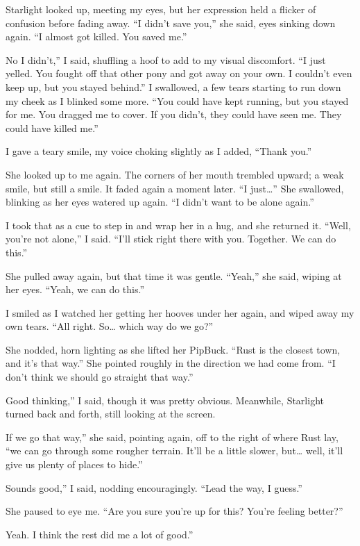 Starlight looked up, meeting my eyes, but her expression held a flicker of confusion before fading away. “I didn’t save you,” she said, eyes sinking down again. “I almost got killed. You saved me.”

\leavevmode{}No I didn’t,” I said, shuffling a hoof to add to my visual discomfort. “I just yelled. You fought off that other pony and got away on your own. I couldn’t even keep up, but you stayed behind.” I swallowed, a few tears starting to run down my cheek as I blinked some more. “You could have kept running, but you stayed for me. You dragged me to cover. If you didn’t, they could have seen me. They could have killed me.”

I gave a teary smile, my voice choking slightly as I added, “Thank you.”

She looked up to me again. The corners of her mouth trembled upward; a weak smile, but still a smile. It faded again a moment later. “I just…” She swallowed, blinking as her eyes watered up again. “I didn’t want to be alone again.”

I took that as a cue to step in and wrap her in a hug, and she returned it. “Well, you’re not alone,” I said. “I’ll stick right there with you. Together. We can do this.”

She pulled away again, but that time it was gentle. “Yeah,” she said, wiping at her eyes. “Yeah, we can do this.”

I smiled as I watched her getting her hooves under her again, and wiped away my own tears. “All right. So… which way do we go?”

She nodded, horn lighting as she lifted her PipBuck. “Rust is the closest town, and it’s that way.” She pointed roughly in the direction we had come from. “I don’t think we should go straight that way.”

\leavevmode{}Good thinking,” I said, though it was pretty obvious. Meanwhile, Starlight turned back and forth, still looking at the screen.

\leavevmode{}If we go that way,” she said, pointing again, off to the right of where Rust lay, “we can go through some rougher terrain. It’ll be a little slower, but… well, it’ll give us plenty of places to hide.”

\leavevmode{}Sounds good,” I said, nodding encouragingly. “Lead the way, I guess.”

She paused to eye me. “Are you sure you’re up for this? You’re feeling better?”

\leavevmode{}Yeah. I think the rest did me a lot of good.”

